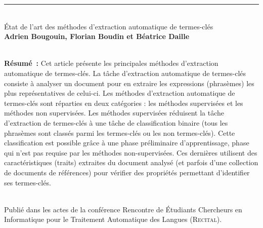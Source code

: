   \vspace{2.5em}\hrule\vspace{2.5em}

  ~\\État de l'art des méthodes d'extraction automatique de
  termes-clés\\\textbf{Adrien Bougouin, Florian Boudin et Béatrice
  Daille}\\\cite{bougouin2013stateoftheart}

  ~\\\textbf{Résumé~:}
  Cet article présente les principales méthodes d'extraction automatique de
  termes-clés. La tâche d'extraction automatique de termes-clés consiste à
  analyser un document pour en extraire les expressions (phrasèmes) les plus
  représentatives de celui-ci. Les méthodes d'extraction automatique de
  termes-clés sont réparties en deux catégories : les méthodes supervisées et
  les méthodes non supervisées. Les méthodes supervisées réduisent la tâche
  d'extraction de termes-clés à une tâche de classification binaire (tous les
  phrasèmes sont classés parmi les termes-clés ou les non termes-clés). Cette
  classification est possible grâce à une phase préliminaire d'apprentissage,
  phase qui n'est pas requise par les méthodes non-supervisées. Ces dernières
  utilisent des caractéristiques (traits) extraites du document analysé (et
  parfois d'une collection de documents de références) pour vérifier des
  propriétés permettant d'identifier ses termes-clés.

  ~\\Publié dans les actes de la conférence Rencontre de Étudiants Chercheurs en
  Informatique pour le Traitement Automatique des Langues (\textsc{Recital}).
